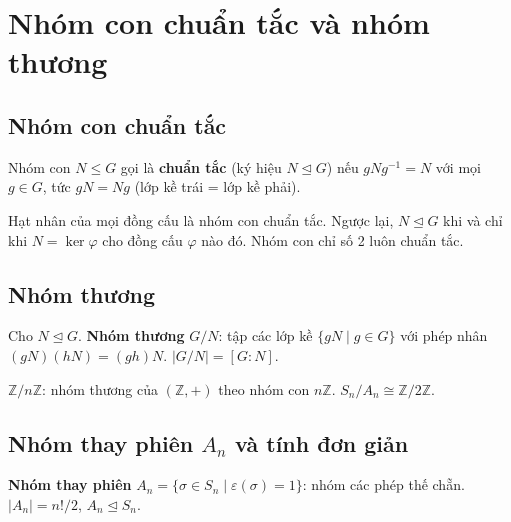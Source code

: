 \documentclass[12pt,a4paper]{article}
\begin{document}
\section{Nhóm con chuẩn tắc và nhóm thương}

\subsection{Nhóm con chuẩn tắc}

\begin{dinhnghia}
  Nhóm con $N \le G$ gọi là \textbf{chuẩn tắc} (ký hiệu $N \trianglelefteq G$) nếu $gNg^{-1} = N$ với mọi $g \in G$, tức $gN = Ng$ (lớp kề trái = lớp kề phải).
\end{dinhnghia}

\begin{tinhchat}
  Hạt nhân của mọi đồng cấu là nhóm con chuẩn tắc. Ngược lại, $N \trianglelefteq G$ khi và chỉ khi $N = \ker \varphi$ cho đồng cấu $\varphi$ nào đó. Nhóm con chỉ số 2 luôn chuẩn tắc.
\end{tinhchat}

\subsection{Nhóm thương}

\begin{dinhnghia}
  Cho $N \trianglelefteq G$. \textbf{Nhóm thương} $G/N$: tập các lớp kề $\{gN \mid g \in G\}$ với phép nhân $(gN)(hN) = (gh)N$. $|G/N| = [G:N]$.
\end{dinhnghia}

\begin{vidu}
  $\mathbb{Z}/n\mathbb{Z}$: nhóm thương của $(\mathbb{Z}, +)$ theo nhóm con $n\mathbb{Z}$. $S_n / A_n \cong \mathbb{Z}/2\mathbb{Z}$.
\end{vidu}

\subsection{Nhóm thay phiên $A_n$ và tính đơn giản}

\begin{dinhnghia}
  \textbf{Nhóm thay phiên} $A_n = \{\sigma \in S_n \mid \varepsilon(\sigma) = 1\}$: nhóm các phép thế chẵn. $|A_n| = n!/2$, $A_n \trianglelefteq S_n$.
\end{dinhnghia}
\end{document}
